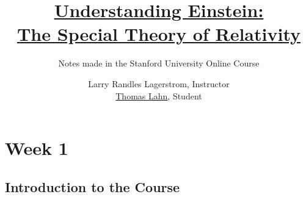 \documentclass[pagesize,headsepline,10pt,parskip=half]{scrreprt}
\begin{document}

  \begin{titlepage}
    \title{\href{https://www.coursera.org/learn/einstein-relativity/}{Understanding Einstein:\\The Special Theory of Relativity}}
    \subtitle{Notes made in the Stanford University Online Course}
    \author{Larry Randles Lagerstrom, Instructor\\\href{http://PointedEars.de/}{Thomas Lahn}, Student}
    \maketitle
  \end{titlepage}

  \clearpage
  \begin{spacing}{1}
    \tableofcontents
    \thispagestyle{empty}
  \end{spacing}


  \clearpage
  \chapter{Week 1}
    \section{Introduction to the Course}
\end{document}
